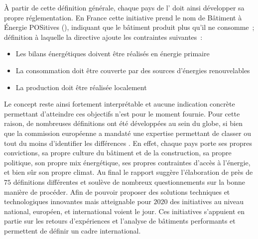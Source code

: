 À partir de cette définition générale, chaque pays de l’ doit ainsi développer sa
propre réglementation. En France cette initiative prend le nom de Bâtiment à
Énergie POSitives (), indiquant que le bâtiment produit plus qu’il ne consomme~; définition
à laquelle la directive ajoute les contraintes suivantes~:
\begin{itemize}
    \item Les bilans énergétiques doivent être réalisés en énergie primaire
    \item La consommation doit être couverte par des sources d’énergies renouvelables
    \item La production doit être réalisée localement
\end{itemize}
Le concept reste ainsi fortement interprétable et aucune indication concrète
permettant d’atteindre ces objectifs n’est pour le moment fournie.
Pour cette raison, de nombreuses définitions ont été développées au sein du globe,
si bien que la commission européenne a mandaté une expertise permettant de classer ou
tout du moins d’identifier les différences \parencite{ECOFYS2013}. En effet, chaque pays
porte ses propres convictions, sa propre culture du bâtiment et de la construction, sa
propre politique, son propre mix énergétique, ses propres contraintes d’accès à l’énergie,
et bien sûr son propre climat.
Au final le rapport suggère l’élaboration de près de $75$ définitions différentes et
soulève de nombreux questionnements sur la bonne manière de procéder. Afin de pouvoir
proposer des solutions techniques et technologiques innovantes mais atteignable pour
$2020$ des initiatives au niveau national, européen, et international voient le jour.
Ces initiatives s’appuient en partie sur les retours d’expériences et l’analyse de bâtiments
performants et permettent de définir un cadre international.



